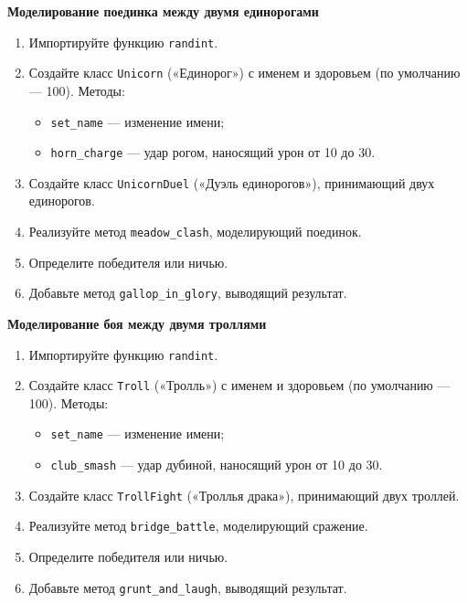 \item \textbf{Моделирование поединка между двумя единорогами}

\begin{enumerate}
    \item Импортируйте функцию \texttt{randint}.

    \item Создайте класс \texttt{Unicorn} («Единорог») с именем и здоровьем (по умолчанию — 100).  
    Методы:
    \begin{itemize}
        \item \texttt{set\_name} — изменение имени;
        \item \texttt{horn\_charge} — удар рогом, наносящий урон от 10 до 30.
    \end{itemize}

    \item Создайте класс \texttt{UnicornDuel} («Дуэль единорогов»), принимающий двух единорогов.

    \item Реализуйте метод \texttt{meadow\_clash}, моделирующий поединок.

    \item Определите победителя или ничью.

    \item Добавьте метод \texttt{gallop\_in\_glory}, выводящий результат.
\end{enumerate}

\item \textbf{Моделирование боя между двумя троллями}

\begin{enumerate}
    \item Импортируйте функцию \texttt{randint}.

    \item Создайте класс \texttt{Troll} («Тролль») с именем и здоровьем (по умолчанию — 100).  
    Методы:
    \begin{itemize}
        \item \texttt{set\_name} — изменение имени;
        \item \texttt{club\_smash} — удар дубиной, наносящий урон от 10 до 30.
    \end{itemize}

    \item Создайте класс \texttt{TrollFight} («Троллья драка»), принимающий двух троллей.

    \item Реализуйте метод \texttt{bridge\_battle}, моделирующий сражение.

    \item Определите победителя или ничью.

    \item Добавьте метод \texttt{grunt\_and\_laugh}, выводящий результат.
\end{enumerate}

